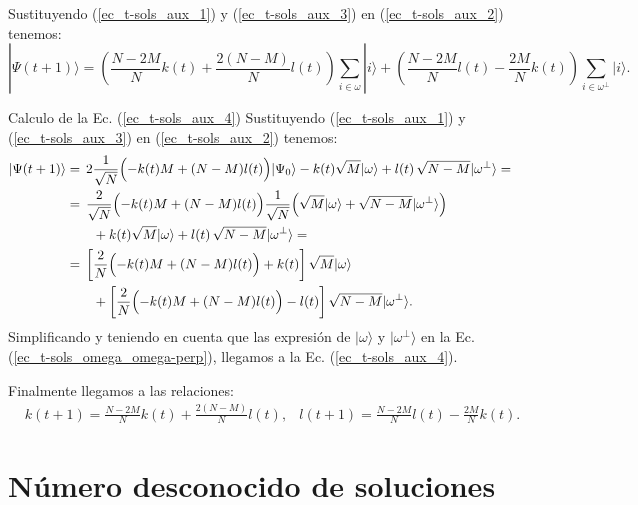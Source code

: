 \documentclass[a4paper,11pt]{book} %
\numberwithin{equation}{chapter}
\def\lp{\left(}
\def\rp{\right)}
\def\lc{\left[}
\def\rc{\right]}
\def\Lp{\Bigl(}
\def\Rp{\Bigr)}
\begin{document}
Sustituyendo (\ref{ec_t-sols_aux_1}) y (\ref{ec_t-sols_aux_3}) en (\ref{ec_t-sols_aux_2}) tenemos:
\begin{equation} \label{ec_t-sols_aux_4}
|\Psi(t+1) \rangle  = \lp \frac{N-2M}{N} k(t) + \frac{2(N-M)}{N} l(t) \rp \sum_{i \in \omega} | i \rangle + \lp \frac{N-2M}{N} l(t) - \frac{2M}{N} k(t) \rp \sum_{i \in \omega^{\perp}} | i \rangle.
\end{equation}
	
	\begin{mybox_green}{Calculo de la Ec. (\ref{ec_t-sols_aux_4})}
	Sustituyendo (\ref{ec_t-sols_aux_1}) y (\ref{ec_t-sols_aux_3}) en (\ref{ec_t-sols_aux_2}) tenemos:
	\begin{align*}
	|\Psi (t+1) \rangle & = 
	\, 2  \frac{1}{\sqrt{N}} \Lp -k(t) M + (N-M) l(t) \Rp | \Psi_0 \rangle 
	- k(t) \sqrt{M} |\omega \rangle +  l(t) \, \sqrt{N-M} | \omega^{\perp} \rangle  = \\
	& =  \, \frac{2}{\sqrt{N}} \Lp -k(t) M + (N-M) l(t) \Rp  \frac{1}{\sqrt{N}} \Lp \sqrt{M} | \omega \rangle + \sqrt{N-M} |\omega^{\perp} \rangle \Rp \\ 
	& \qquad + k(t) \sqrt{M} |\omega \rangle  +   l(t) \, \sqrt{N-M} | \omega^{\perp} \rangle = \\
	& =  \, \lc \frac{2}{N} \Lp -k(t) M + (N-M) l(t) \Rp + k(t) \rc \sqrt{M}  | \omega \rangle   \\
	& \qquad + \lc \frac{2}{N}  \Lp -k(t) M + (N-M) l(t) \Rp - l(t)  \rc \sqrt{N-M} | \omega^{\perp} \rangle.
	\end{align*}
	Simplificando y teniendo en cuenta que las expresión de $| \omega \rangle$ y $|\omega^{\perp} \rangle$ en la 
	Ec. (\ref{ec_t-sols_omega_omega-perp}), llegamos a la Ec. (\ref{ec_t-sols_aux_4}).
	\end{mybox_green}

Finalmente llegamos a las relaciones:
\begin{equation} \label{ec_t-sols_k-l_j+1}
\begin{aligned} 
& \boxed{k(t+1) = \frac{N-2M}{N} k(t) + \frac{2(N-M)}{N} l(t)},
& \boxed{l(t+1) = \frac{N-2M}{N} l(t) - \frac{2M}{N}k(t)}.
\end{aligned}
\end{equation}



\section{Número desconocido de soluciones} \label{sec_t_no_conocido}
\end{document}
